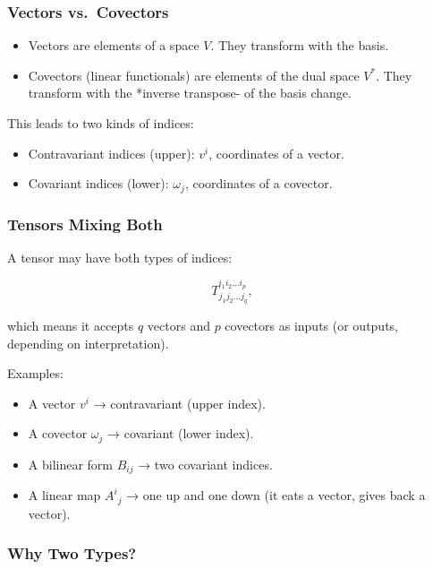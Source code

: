 \documentclass[
  letterpaper,
  DIV=11,
  numbers=noendperiod]{scrreprt}
\providecommand{\tightlist}{%
  \setlength{\itemsep}{0pt}\setlength{\parskip}{0pt}}
\begin{document}
\subsubsection{Vectors vs.~Covectors}\label{vectors-vs.-covectors}

\begin{itemize}
\tightlist
\item
  Vectors are elements of a space \(V\). They transform with the basis.
\item
  Covectors (linear functionals) are elements of the dual space \(V^*\).
  They transform with the *inverse transpose- of the basis change.
\end{itemize}

This leads to two kinds of indices:

\begin{itemize}
\tightlist
\item
  Contravariant indices (upper): \(v^i\), coordinates of a vector.
\item
  Covariant indices (lower): \(\omega_j\), coordinates of a covector.
\end{itemize}

\subsubsection{Tensors Mixing Both}\label{tensors-mixing-both}

A tensor may have both types of indices:

\[
T^{i_1 i_2 \dots i_p}_{j_1 j_2 \dots j_q},
\]

which means it accepts \(q\) vectors and \(p\) covectors as inputs (or
outputs, depending on interpretation).

Examples:

\begin{itemize}
\tightlist
\item
  A vector \(v^i\) → contravariant (upper index).
\item
  A covector \(\omega_j\) → covariant (lower index).
\item
  A bilinear form \(B_{ij}\) → two covariant indices.
\item
  A linear map \(A^i{}_j\) → one up and one down (it eats a vector,
  gives back a vector).
\end{itemize}

\subsubsection{Why Two Types?}\label{why-two-types}
\end{document}
